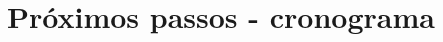 \documentclass[normaltoc, espacoumemeio, pnumromarab,ruledheader]{abnt}
\begin{document}





\section{Próximos passos - cronograma}
\end{document}
